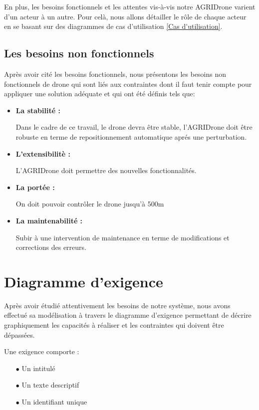 	En plus, les besoins fonctionnels et les attentes vis-à-vis notre AGRIDrone varient d'un acteur à un autre. Pour celà, nous allons détailler le rôle de chaque acteur en se basant sur des diagrammes de cas d'utilisation \ref{Cas d'utilisation}.
	
	\subsection{Les besoins non fonctionnels}
	Après avoir cité les besoins fonctionnels, nous présentons
	les besoins non fonctionnels de drone qui sont liés aux contraintes dont il faut tenir compte pour appliquer une solution adéquate et qui ont été définis tels que:
	\begin{itemize}
		\item \textbf{La stabilité :}
		
		
		Dans le cadre de ce travail, le drone devra être stable, l'AGRIDrone doit être robuste en terme de repositionnement automatique aprés une perturbation.	
		
		\item \textbf{L'extensibilitè : }
		
		
		L'AGRIDrone doit permettre des nouvelles fonctionnalités.
		
		\item \textbf{La portée : } 
		
		
		On doit pouvoir contrôler le drone jusqu'à 500m
		
		
		\item \textbf{La maintenabilité : }  
		
		Subir à une intervention de maintenance en terme de modifications et corrections des erreurs.
		\end {itemize}
		\section{Diagramme d'exigence }
		Après avoir étudié attentivement les besoins de  notre système, nous avons effectué sa modélisation à travers le diagramme d'exigence permettant de décrire graphiquement les capacités à réaliser et les contraintes qui doivent être dépassées.
		
    	Une exigence comporte : 
		\begin{itemize}
			\item [$\bullet$] Un intitulé 
			
			\item [$\bullet$]Un texte descriptif 
			
			\item [$\bullet$]Un identifiant unique
		\end{itemize}
		
